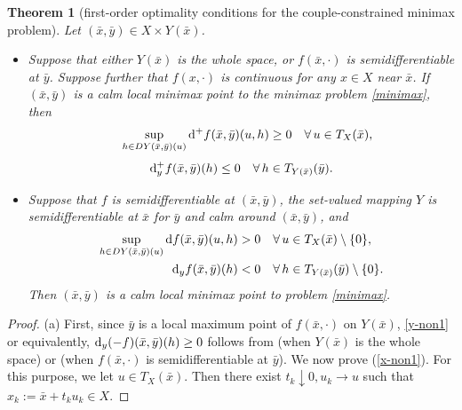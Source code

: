 \documentclass[11pt]{article}
\numberwithin{equation}{section}
\newtheorem{theorem}{Theorem}[section]
\begin{document}
{\begin{theorem}[first-order optimality conditions for the  couple-constrained minimax problem]\label{1st-non1}
Let $(\bar x, \bar y) \in X \times  Y(\bar x)$.
\begin{itemize}
\item[(a)] Suppose that either $Y(\bar x)$ is the whole space, or $f(\bar x,\cdot)$ is semidifferentiable at $\bar y$.  Suppose further that $f(x,\cdot)$ is continuous for any $x \in X$ near $\bar x$.
If $(\bar x, \bar y)$ is a calm local minimax point to the minimax problem \eqref{minimax}, then
\begin{eqnarray}\label{x-non1}
&& \sup_{h \in D Y(\bar x,\bar y)(u)} {\rm d}^+f(\bar{x}, \bar{y})(u,h) \geq 0 \quad \forall\, u \in T_X(\bar{x}),
\end{eqnarray}
\begin{equation}\label{y-non1}
{\rm d}_y^+ f(\bar{x}, \bar{y})(h) \leq 0\quad \forall\, h \in T_{Y(\bar x)}(\bar{y}).
\end{equation}
\item[(b)] Suppose that $f$ is semidifferentiable at $(\bar x,\bar y)$, the set-valued mapping $Y$ is semidifferentiable at $\bar x$ for $\bar y$ and calm around $(\bar x,\bar y)$, and
   \begin{align*}
  \sup_{h \in D Y(\bar x,\bar y)(u)} {\rm d}f(\bar{x}, \bar{y})(u,h) > 0 \quad &\forall\, u \in T_X(\bar{x}) \setminus \{0\}, \label{} \\
  {\rm d}_y f(\bar x,\bar y)(h)<0 \quad  &\forall\, h \in T_{ Y(\bar x)}(\bar y) \setminus \{0\}. \label{}
   \end{align*}
Then $(\bar x, \bar y)$ is a calm local minimax point to problem \eqref{minimax}.
\end{itemize}
\end{theorem}
\begin{proof}

(a) First, since $\bar y$ is a local maximum point of $f(\bar x,\cdot)$ on $Y(\bar x)$, \eqref{y-non1} or equivalently, {${\rm d}_y(-f)(\bar x,\bar y)(h)\geq 0$} follows from
\cite[Proposition 2.6 (i)]{Ma2023} (when $Y(\bar x)$ is the whole space) or \cite[Proposition 2.8 (i)]{Ma2023} (when $f(\bar x,\cdot)$ is semidifferentiable at $\bar y$).
We now prove (\ref{x-non1}). For this purpose, we let $u \in T_X(\bar{x})$. Then there exist $t_k \downarrow 0, u_k \to u$ such that $x_k:= \bar x+t_ku_k \in X$.


\end{proof}}
\end{document}
